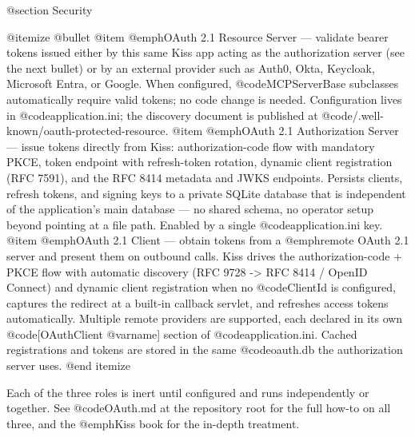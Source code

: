 @section Security

@itemize @bullet
@item @emph{OAuth 2.1 Resource Server} --- validate bearer tokens
issued either by this same Kiss app acting as the authorization server
(see the next bullet) or by an external provider such as Auth0, Okta,
Keycloak, Microsoft Entra, or Google.  When configured,
@code{MCPServerBase} subclasses automatically require valid tokens; no
code change is needed.  Configuration lives in
@code{application.ini}; the discovery document is published at
@code{/.well-known/oauth-protected-resource}.
@item @emph{OAuth 2.1 Authorization Server} --- issue tokens directly
from Kiss: authorization-code flow with mandatory PKCE, token endpoint
with refresh-token rotation, dynamic client registration (RFC 7591),
and the RFC 8414 metadata and JWKS endpoints.  Persists clients,
refresh tokens, and signing keys to a private SQLite database that is
independent of the application's main database --- no shared schema,
no operator setup beyond pointing at a file path.  Enabled by a single
@code{application.ini} key.
@item @emph{OAuth 2.1 Client} --- obtain tokens from a @emph{remote}
OAuth 2.1 server and present them on outbound calls.  Kiss drives the
authorization-code + PKCE flow with automatic discovery (RFC 9728 ->
RFC 8414 / OpenID Connect) and dynamic client registration when no
@code{ClientId} is configured, captures the redirect at a built-in
callback servlet, and refreshes access tokens automatically.  Multiple
remote providers are supported, each declared in its own
@code{[OAuthClient @var{name}]} section of @code{application.ini}.
Cached registrations and tokens are stored in the same @code{oauth.db}
the authorization server uses.
@end itemize

Each of the three roles is inert until configured and runs
independently or together.  See @code{OAuth.md} at the repository root
for the full how-to on all three, and the @emph{Kiss} book for the
in-depth treatment.
